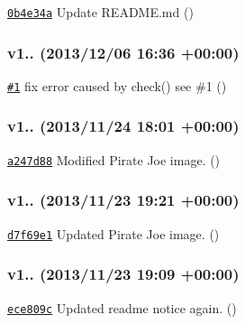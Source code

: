 \begin{DoxyItemize}
\item \href{https://github.com/bcoe/yargs/commit/0b4e34af5e6d84a9dbb3bb6d02cd87588031c182}{\tt 0b4e34a} Update R\+E\+A\+D\+M\+E.\+md ()
\end{DoxyItemize}

\subsubsection*{v1.. (2013/12/06 16\+:36 +00\+:00)}


\begin{DoxyItemize}
\item \href{https://github.com/bcoe/yargs/pull/1}{\tt \#1} fix error caused by check() see \#1 ()
\end{DoxyItemize}

\subsubsection*{v1.. (2013/11/24 18\+:01 +00\+:00)}


\begin{DoxyItemize}
\item \href{https://github.com/bcoe/yargs/commit/a247d88d6e46644cbb7303c18b1bb678fc132d72}{\tt a247d88} Modified Pirate Joe image. ()
\end{DoxyItemize}

\subsubsection*{v1.. (2013/11/23 19\+:21 +00\+:00)}


\begin{DoxyItemize}
\item \href{https://github.com/bcoe/yargs/commit/d7f69e1d34bc929736a8bdccdc724583e21b7eab}{\tt d7f69e1} Updated Pirate Joe image. ()
\end{DoxyItemize}

\subsubsection*{v1.. (2013/11/23 19\+:09 +00\+:00)}


\begin{DoxyItemize}
\item \href{https://github.com/bcoe/yargs/commit/ece809cf317cc659175e1d66d87f3ca68c2760be}{\tt ece809c} Updated readme notice again. ()
\end{DoxyItemize}

